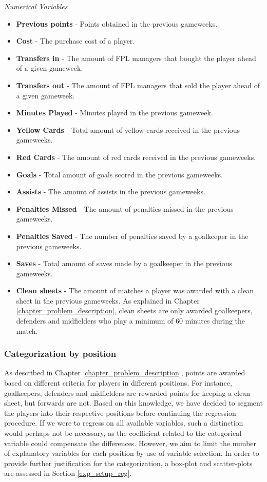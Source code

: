 \textit{Numerical Variables}
\newpar
\begin{itemize}
    \item \textbf{Previous points} - Points obtained in the previous gameweeks.
    \item \textbf{Cost} - The purchase cost of a player.
    \item \textbf{Transfers in} - The amount of FPL managers that bought the player ahead of a given gameweek.
    \item \textbf{Transfers out} - The amount of FPL managers that sold the player ahead of a given gameweek.
    \item \textbf{Minutes Played} - Minutes played in the previous gameweek.
    \item \textbf{Yellow Cards} - Total amount of yellow cards received in the previous gameweeks.
    \item \textbf{Red Cards} - The amount of red cards received in the previous gameweeks.
    \item \textbf{Goals} - Total amount of goals scored in the previous gameweeks.
    \item \textbf{Assists} - The amount of assists in the previous gameweeks.
    \item \textbf{Penalties Missed} - The amount of penalties missed in the previous gameweeks.
    \item \textbf{Penalties Saved} - The number of penalties saved by a goalkeeper in the previous gameweeks.
    \item \textbf{Saves} - Total amount of saves made by a goalkeeper in the previous gameweeks.
    \item \textbf{Clean sheets} - The amount of matches a player was awarded with a clean sheet in the previous gameweeks. As explained in Chapter \ref{chapter_problem_description}, clean sheets are only awarded goalkeepers, defenders and midfielders who play a minimum of 60 minutes during the match.
    
\end{itemize}

\subsubsection{Categorization by position}


As described in Chapter \ref{chapter_problem_description}, points are awarded based on different criteria for players in different positions. For instance, goalkeepers, defenders and midfielders are rewarded points for keeping a clean sheet, but forwards are not. Based on this knowledge, we have decided to segment the players into their respective positions before continuing the regression procedure. If we were to regress on all available variables, such a distinction would perhaps not be necessary, as the coefficient related to the categorical variable could compensate the differences. However, we aim to limit the number of explanatory variables for each position by use of variable selection. In order to provide further justification for the categorization, a box-plot and scatter-plots are assessed in Section \ref{exp_setup_reg}.

